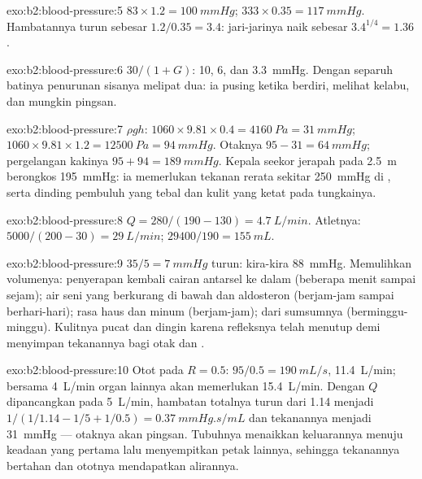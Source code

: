 \begin{solution}{exo:b2:blood-pressure:5}
$83\times 1.2 = \qty{100}{mmHg}$; $333\times 0.35 = \qty{117}{mmHg}$.
Hambatannya turun sebesar $1.2/0.35 = 3.4$: jari-jarinya naik sebesar
$3.4^{1/4} =
1.36$.
\end{solution}

\begin{solution}{exo:b2:blood-pressure:6}
$30/(1 + G)$: 10, 6, dan \qty{3.3}{mmHg}. Dengan separuh batinya
penurunan sisanya melipat dua: ia pusing ketika berdiri, melihat
kelabu, dan mungkin pingsan.
\end{solution}

\begin{solution}{exo:b2:blood-pressure:7}
$\rho g h$: $1060\times 9.81\times 0.4 = \qty{4160}{Pa} =
\qty{31}{mmHg}$; $1060\times 9.81\times 1.2 = \qty{12500}{Pa} =
\qty{94}{mmHg}$. Otaknya $95 - 31 = \qty{64}{mmHg}$; pergelangan
kakinya $95 + 94 =
\qty{189}{mmHg}$. Kepala seekor jerapah pada
\qty{2.5}{m} berongkos \qty{195}{mmHg}: ia memerlukan tekanan rerata
sekitar \qty{250}{mmHg} di , serta dinding pembuluh yang
tebal dan kulit yang ketat pada tungkainya.
\end{solution}

\begin{solution}{exo:b2:blood-pressure:8}
$Q = 280/(190 - 130) = \qty{4.7}{L/min}$. Atletnya: $5000/(200 - 30) =
\qty{29}{L/min}$;  $\num{29400}/190 = \qty{155}{mL}$.
\end{solution}

\begin{solution}{exo:b2:blood-pressure:9}
$35/5 = \qty{7}{mmHg}$ turun: kira-kira \qty{88}{mmHg}. Memulihkan
volumenya: penyerapan kembali cairan antarsel ke dalam 
(beberapa menit sampai sejam); air seni yang berkurang di bawah  dan aldosteron (berjam-jam sampai berhari-hari); rasa haus
dan minum (berjam-jam);  dari sumsumnya
(berminggu-minggu). Kulitnya pucat dan dingin karena refleksnya telah
menutup  demi menyimpan tekanannya bagi otak dan .
\end{solution}

\begin{solution}{exo:b2:blood-pressure:10}
Otot pada $R = 0.5$: $95/0.5 = \qty{190}{mL/s}$, \qty{11.4}{L/min};
bersama \qty{4}{L/min} organ lainnya  akan memerlukan
\qty{15.4}{L/min}. Dengan $Q$ dipancangkan pada \qty{5}{L/min},
hambatan totalnya turun dari 1.14 menjadi $1/(1/1.14 - 1/5 + 1/0.5) =
\qty{0.37}{mmHg.s/mL}$ dan tekanannya menjadi \qty{31}{mmHg} ---
otaknya akan pingsan. Tubuhnya menaikkan keluarannya menuju keadaan
yang pertama lalu menyempitkan petak lainnya, sehingga tekanannya
bertahan dan ototnya mendapatkan alirannya.
\end{solution}

